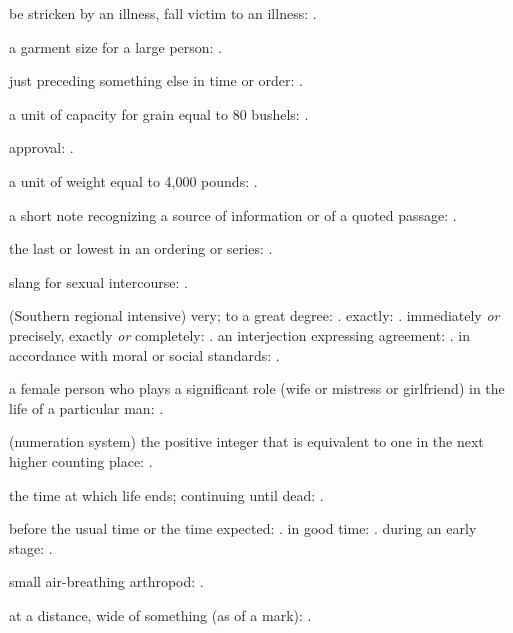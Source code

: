   be stricken by an illness, fall victim to an illness:   .

  a garment size for a large person: .

  just preceding something else in time or order:   .

  a unit of capacity for grain equal to 80 bushels: .

  approval:   .

  a unit of weight equal to 4,000 pounds: .

  a short note recognizing a source of information or of a quoted passage:   .

  the last or lowest in an ordering or series: .

  slang for sexual intercourse: .

  (Southern regional intensive) very; to a great degree:   . exactly:   . immediately \textit{or} precisely, exactly \textit{or} completely: . an interjection expressing agreement:   . in accordance with moral or social standards:   .

  a female person who plays a significant role (wife or mistress or girlfriend) in the life of a particular man: .

  (numeration system) the positive integer that is equivalent to one in the next higher counting place:   .

  the time at which life ends; continuing until dead:   .

  before the usual time or the time expected:   . in good time:   . during an early stage:   .

  small air-breathing arthropod: .

  at a distance, wide of something (as of a mark): .

